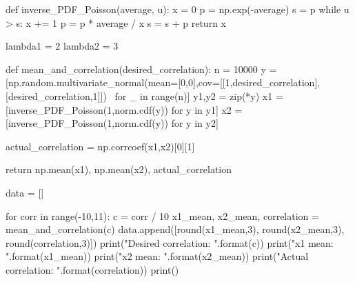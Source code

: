 def inverse_PDF_Poisson(average, u):
    x = 0
    p = np.exp(-average)
    s = p
    while u > s:
        x += 1
        p = p * average / x
        s = s + p
    return x  

lambda1 = 2
lambda2 = 3

def mean_and_correlation(desired_correlation):
    n = 10000
    y = [np.random.multivariate_normal(mean=[0,0],cov=[[1,desired_correlation],[desired_correlation,1]]) \
         for _ in range(n)]
    y1,y2 = zip(*y)
    x1 = [inverse_PDF_Poisson(1,norm.cdf(y)) for y in y1]
    x2 = [inverse_PDF_Poisson(1,norm.cdf(y)) for y in y2]
    
    actual_correlation = np.corrcoef(x1,x2)[0][1]
    
    return np.mean(x1), np.mean(x2), actual_correlation
    
data = []

for corr in range(-10,11):
    c = corr / 10
    x1_mean, x2_mean, correlation = mean_and_correlation(c)
    data.append([round(x1_mean,3), round(x2_mean,3), round(correlation,3)])
    print("Desired correlation: {}".format(c))
    print("x1 mean: {}".format(x1_mean))
    print("x2 mean: {}".format(x2_mean))
    print("Actual correlation: {}".format(correlation))
    print()